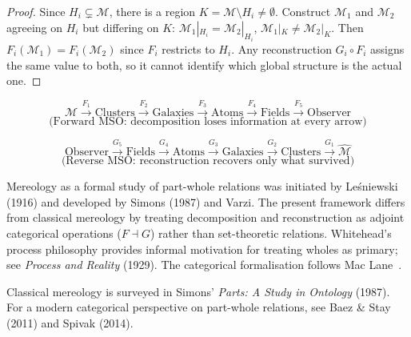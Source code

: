 \begin{proof}
  Since $H_i \subsetneq \mathcal{M}$, there is a region
  $K = \mathcal{M} \setminus H_i \neq \emptyset$.
  Construct $\mathcal{M}_1$ and $\mathcal{M}_2$ agreeing on
  $H_i$ but differing on $K$:
  $\mathcal{M}_1|_{H_i} = \mathcal{M}_2|_{H_i}$,
  $\mathcal{M}_1|_K \neq \mathcal{M}_2|_K$.
  Then $F_i(\mathcal{M}_1) = F_i(\mathcal{M}_2)$ since $F_i$
  restricts to $H_i$.
  Any reconstruction $G_i \circ F_i$ assigns the same value
  to both, so it cannot identify which global structure
  is the actual one.
\end{proof}


\[
  \mathcal{M}
  \xrightarrow{F_1} \text{Clusters}
  \xrightarrow{F_2} \text{Galaxies}
  \xrightarrow{F_3} \text{Atoms}
  \xrightarrow{F_4} \text{Fields}
  \xrightarrow{F_5} \text{Observer}
\]
\[
  \text{(Forward MSO: decomposition loses information at every arrow)}
\]

\medskip

\[
  \text{Observer}
  \xrightarrow{G_5} \text{Fields}
  \xrightarrow{G_4} \text{Atoms}
  \xrightarrow{G_3} \text{Galaxies}
  \xrightarrow{G_2} \text{Clusters}
  \xrightarrow{G_1} \widehat{\mathcal{M}}
\]
\[
  \text{(Reverse MSO: reconstruction recovers only what survived)}
\]

\begin{CitationAnchor}
  Mereology as a formal study of part-whole relations was
  initiated by Le\'sniewski (1916) and developed by Simons
  (1987) and Varzi.
  The present framework differs from classical mereology by
  treating decomposition and reconstruction as adjoint
  categorical operations ($F \dashv G$) rather than set-theoretic
  relations.
  Whitehead's process philosophy provides informal motivation
  for treating wholes as primary; see \textit{Process and Reality}
  (1929).
  The categorical formalisation follows Mac Lane~\cite{maclane1998}.
\end{CitationAnchor}

\begin{FurtherReading}
  Classical mereology is surveyed in Simons'
  \textit{Parts: A Study in Ontology} (1987).
  For a modern categorical perspective on part-whole relations,
  see Baez \& Stay (2011) and Spivak (2014).
\end{FurtherReading}
